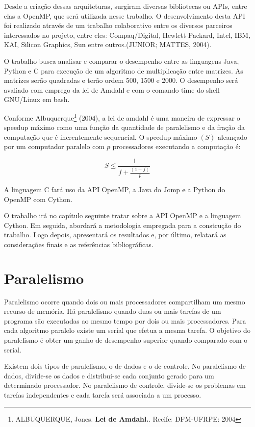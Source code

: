\documentclass[a4paper,12pt]{article}
\begin{document}
	Desde a criação dessas arquiteturas, surgiram diversas bibliotecas ou APIs, entre elas a OpenMP, que será utilizada nesse trabalho. O desenvolvimento  desta API foi realizado através de um trabalho colaborativo entre os diversos parceiros interessados no projeto, entre eles: Compaq/Digital, Hewlett-Packard, Intel, IBM, KAI, Silicon Graphics, Sun entre outros.(JUNIOR; MATTES, 2004). 
	
	O trabalho busca analisar e comparar o desempenho entre as linguagens Java, Python e C para execução de um algoritmo de multiplicação entre matrizes. As matrizes serão quadradas e terão ordem 500, 1500 e 2000. O desempenho será avaliado com emprego da lei de Amdahl e com o comando time do shell GNU/Linux em bash. 
	
	Conforme Albuquerque\footnote{ALBUQUERQUE, Jones. {\bf Lei de Amdahl.}. Recife: DFM-UFRPE: 2004} (2004), a lei de amdahl é uma maneira de expressar o speedup máximo como uma função da quantidade de paralelismo e da fração da computação que é inerentemente sequencial. O speedup máximo $(S)$ alcançado por um computador paralelo com $p$ processadores executando a computação é:
	
\begin{equation}
  \label{eq:amdahl}
   S \le \frac{1}{f + \frac{(1-f)}{p}}
\end{equation}

A linguagem C fará uso da API OpenMP, a Java do Jomp e a Python do  OpenMP com Cython.

O trabalho irá no capítulo seguinte tratar sobre a API OpenMP e a linguagem Cython. Em seguida, abordará a metodologia empregada para a construção do trabalho. Logo depois, apresentará os resultados e, por último, relatará as considerações finais e as referências bibliográficas. 

\section{Paralelismo}
Paralelismo ocorre quando dois ou mais processadores compartilham um mesmo recurso de memória. Há paralelismo quando duas ou mais tarefas de um programa são executadas ao mesmo tempo por dois ou mais processadores. Para cada algoritmo paralelo existe um serial que efetua a mesma tarefa. O objetivo do paralelismo é obter um ganho de desempenho superior quando comparado com o serial.

Existem dois tipos de paralelismo, o de dados e o de controle. No paralelismo de dados, divide-se os dados e distribui-se cada conjunto gerado para um determinado processador. No paralelismo de controle, divide-se os problemas em tarefas independentes e cada tarefa será associada a um processo.  
\end{document}
